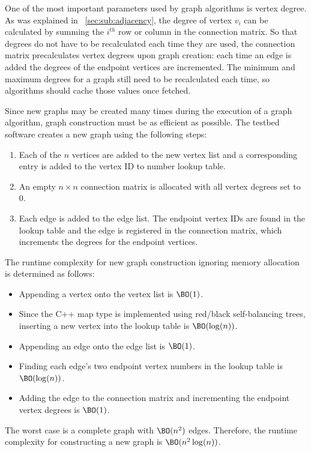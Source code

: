 One of the most important parameters used by graph algorithms is vertex degree.  As was explained in
\sectionname~\ref{sec:sub:adjacency}, the degree of vertex \(v_i\) can be calculated by summing the \(i^{th}\) row
or column in the connection matrix.  So that degrees do not have to be recalculated each time they are used, the
connection matrix precalculates vertex degrees upon graph creation: each time an edge is added the degrees of the
endpoint vertices are incremented.  The minimum and maximum degrees for a graph still need to be recalculated each
time, so algorithms should cache those values once fetched.

Since new graphs may be created many times during the execution of a graph algorithm, graph construction must be
as efficient as possible.  The testbed software creates a new graph using the following steps:
\begin{enumerate}
\item Each of the \(n\) vertices are added to the new vertex list and a corresponding entry is added to the vertex
  ID to number lookup table.
\item An empty \(n\times n\) connection matrix is allocated with all vertex degrees set to \(0\).
\item Each edge is added to the edge list.  The endpoint vertex IDs are found in the lookup table and the edge is
  registered in the connection matrix, which increments the degrees for the endpoint vertices.
\end{enumerate}

The runtime complexity for new graph construction ignoring memory allocation is determined as follows:
\begin{itemize}
\item Appending a vertex onto the vertex list is \(\BO(1)\).
\item Since the C++ map type is implemented using red/black self-balancing trees, inserting a new vertex into the
  lookup table is \(\BO(\log(n))\).
\item Appending an edge onto the edge list is \(\BO(1)\).
\item Finding each edge's two endpoint vertex numbers in the lookup table is \(\BO(\log(n))\).
\item Adding the edge to the connection matrix and incrementing the endpoint vertex degrees is \(\BO(1)\).
\end{itemize}

The worst case is a complete graph with \(\BO(n^2)\) edges.  Therefore, the runtime complexity for
constructing a new graph is \(\BO(n^2\log(n))\).

